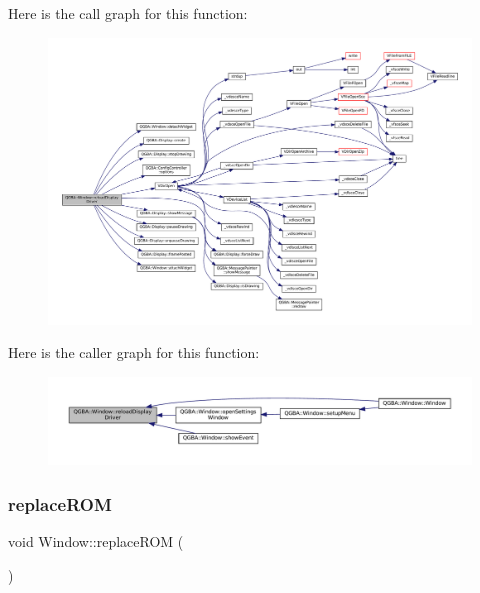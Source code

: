 Here is the call graph for this function\+:
\nopagebreak
\begin{figure}[H]
\begin{center}
\leavevmode
\includegraphics[width=350pt]{class_q_g_b_a_1_1_window_a01573d875972842fe908b15797ce1e06_cgraph}
\end{center}
\end{figure}
Here is the caller graph for this function\+:
\nopagebreak
\begin{figure}[H]
\begin{center}
\leavevmode
\includegraphics[width=350pt]{class_q_g_b_a_1_1_window_a01573d875972842fe908b15797ce1e06_icgraph}
\end{center}
\end{figure}
\mbox{\label{class_q_g_b_a_1_1_window_a6a7f2bc2a0c283d8de4304e383e5eac6}} 
\subsubsection{\texorpdfstring{replace\+R\+OM}{replaceROM}}
{\footnotesize\ttfamily void Window\+::replace\+R\+OM (\begin{DoxyParamCaption}{ }\end{DoxyParamCaption})\hspace{0.3cm}{\ttfamily [slot]}}

